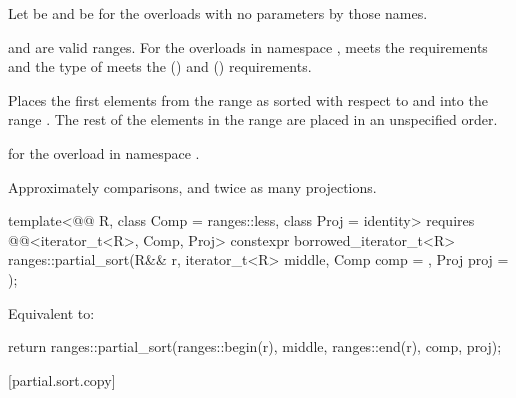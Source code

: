 \begin{itemdescr}
\pnum
Let  be 
and  be 
for the overloads with no parameters by those names.

\pnum
\expects
{} and  are valid ranges.
For the overloads in namespace ,
 meets
the  requirements and
the type of  meets
the  () and
 () requirements.

\pnum
\effects
Places the first  elements
from the range 
as sorted with respect to  and 
into the range .
The rest of the elements in the range 
are placed in an unspecified order.
%

\pnum
\returns
{} for the overload in namespace .

\pnum
\complexity
Approximately  comparisons, and
twice as many projections.
\end{itemdescr}

\begin{itemdecl}
template<@@ R, class Comp = ranges::less, class Proj = identity>
  requires @@<iterator_t<R>, Comp, Proj>
  constexpr borrowed_iterator_t<R>
    ranges::partial_sort(R&& r, iterator_t<R> middle, Comp comp = {}, Proj proj = {});
\end{itemdecl}

\begin{itemdescr}
\pnum
\effects
Equivalent to:
\begin{codeblock}
return ranges::partial_sort(ranges::begin(r), middle, ranges::end(r), comp, proj);
\end{codeblock}
\end{itemdescr}

[partial.sort.copy]{}

